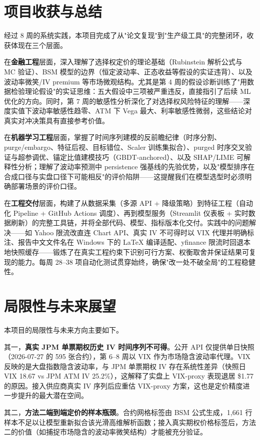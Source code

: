 \documentclass[11pt,a4paper]{article}
\begin{document}
\section{项目收获与总结}

经过 8 周的系统实践，本项目完成了从"论文复现"到"生产级工具"的完整闭环，收获体现在三个层面。

在\textbf{金融工程}层面，深入理解了选择权定价的理论基础（Rubinstein 解析公式与 MC 验证）、BSM 模型的边界（恒定波动率、正态收益等假设的实证违背）、以及波动率微笑/IV premium 等市场微观结构。尤其是第 4 周的假设诊断训练了"用数据检验理论假设"的实证思维：五大假设中三项被严重违反，直接指引了后续 ML 优化的方向。同时，第 7 周的敏感性分析深化了对选择权风险特征的理解——深度实值下波动率敏感性趋零、ATM 下 Vega 最大、利率敏感性微弱，这些结论对真实对冲决策具有直接参考价值。

在\textbf{机器学习工程}层面，掌握了时间序列建模的反前瞻纪律（时序分割、purge/embargo、特征后视、目标错位、Scaler 训练集拟合）、purged 时序交叉验证与超参调优、锚定比值建模技巧（GBDT-anchored）、以及 SHAP/LIME 可解释性分析；理解了波动率预测中 persistence 强基线的先验优势，以及"模型排序在合成口径与实盘口径下可能相反"的评价陷阱——这提醒我们在模型选型时必须明确部署场景的评价口径。

在\textbf{工程交付}层面，构建了从数据采集（多源 API + 降级策略）到特征工程（自动化 Pipeline + GitHub Actions 调度）、再到模型服务（Streamlit 仪表板 + 实时数据刷新）的完整工具链，并将全部代码、模型、指标版本化交付。实践中的问题解决——如 Yahoo 限流改直连 Chart API、真实 IV 不可得时以 VIX 代理并明确标注、报告中文文件名在 Windows 下的 LaTeX 编译适配、yfinance 限流时回退本地快照缓存——锻炼了在真实工程约束下识别可行方案、权衡取舍并保证结果可复现的能力。每周 28--38 项自动化测试贯穿始终，确保"改一处不破全局"的工程稳健性。

\section{局限性与未来展望}

本项目的局限性与未来方向主要如下。

其一，\textbf{真实 JPM 单票期权历史 IV 时间序列不可得}。公开 API 仅提供单日快照（2026-07-27 的 595 张合约），第 6--8 周以 VIX 作为市场隐含波动率代理。VIX 反映的是大盘指数隐含波动率，与 JPM 单票期权 IV 存在系统性差异（快照日 VIX 18.67 vs JPM ATM IV 25.2\%），这解释了实盘上 VIX-proxy 表现退居 \$1.77 的原因。接入供应商真实 IV 序列后应重估 VIX-proxy 方案，这也是定价精度进一步提升的最大潜在空间。

其二，\textbf{方法二端到端定价的样本瓶颈}。合约网格标签由 BSM 公式生成，1,661 行样本不足以让模型重新拟合该光滑高维解析函数；接入真实期权价格标签后，方法二的价值（如捕捉市场隐含的波动率微笑结构）才能被充分验证。
\end{document}

